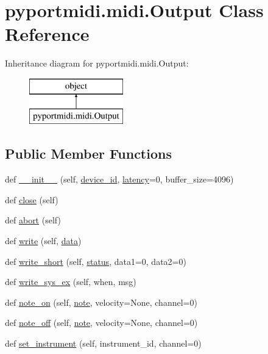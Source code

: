 \hypertarget{classpyportmidi_1_1midi_1_1_output}{}\section{pyportmidi.\+midi.\+Output Class Reference}
\label{classpyportmidi_1_1midi_1_1_output}
Inheritance diagram for pyportmidi.\+midi.\+Output\+:\begin{figure}[H]
\begin{center}
\leavevmode
\includegraphics[height=2.000000cm]{classpyportmidi_1_1midi_1_1_output}
\end{center}
\end{figure}
\subsection*{Public Member Functions}
\begin{DoxyCompactItemize}
\item 
def \hyperlink{classpyportmidi_1_1midi_1_1_output_acace8aa763ce6e90bc578052fc1a7c78}{\+\_\+\+\_\+init\+\_\+\+\_\+} (self, \hyperlink{classpyportmidi_1_1midi_1_1_output_a2740ce8bc8861bedab98a7e56f9cdeb9}{device\+\_\+id}, \hyperlink{portmidi_2pm__test_2test_8c_abe13b7efd223bb5d20e2f3710b43bcd2}{latency}=0, buffer\+\_\+size=4096)
\item 
def \hyperlink{classpyportmidi_1_1midi_1_1_output_ab239e15331b6dd26d5d131976b46dae7}{close} (self)
\item 
def \hyperlink{classpyportmidi_1_1midi_1_1_output_a1598727090193872eb21185b926030f2}{abort} (self)
\item 
def \hyperlink{classpyportmidi_1_1midi_1_1_output_a81513a147adb67589f826852c033d251}{write} (self, \hyperlink{lib_2expat_8h_ac39e72a1de1cb50dbdc54b08d0432a24}{data})
\item 
def \hyperlink{classpyportmidi_1_1midi_1_1_output_a48ad7413755bc9de8f79864167996379}{write\+\_\+short} (self, \hyperlink{rfft2d_test_m_l_8m_a1b5437a866e6f95107b07ba845bc1800}{status}, data1=0, data2=0)
\item 
def \hyperlink{classpyportmidi_1_1midi_1_1_output_a91215eb76a95600953077b9255d45d92}{write\+\_\+sys\+\_\+ex} (self, when, msg)
\item 
def \hyperlink{classpyportmidi_1_1midi_1_1_output_af264528f8d1135a711c6d3e3bdf92dbe}{note\+\_\+on} (self, \hyperlink{handlers_8c_a82c195c0687005edfeb733c7b5887c33}{note}, velocity=None, channel=0)
\item 
def \hyperlink{classpyportmidi_1_1midi_1_1_output_a1d552276c413494bc8a94dc2c3f588c4}{note\+\_\+off} (self, \hyperlink{handlers_8c_a82c195c0687005edfeb733c7b5887c33}{note}, velocity=None, channel=0)
\item 
def \hyperlink{classpyportmidi_1_1midi_1_1_output_ad2a82e8023a1dd5a18776d15cc4a9b76}{set\+\_\+instrument} (self, instrument\+\_\+id, channel=0)
\end{DoxyCompactItemize}
